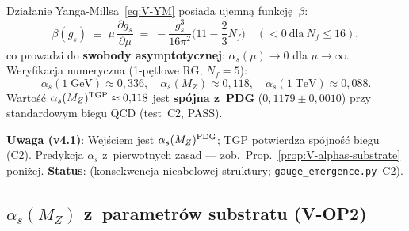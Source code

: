 \begin{corollary}\label{cor:V-AF}
Dzia\l{}anie Yanga-Millsa~\eqref{eq:V-YM} posiada ujemn\k{a}
funkcj\k{e}~$\beta$:
\begin{equation}\label{eq:V-beta}
  \beta(g_s) \;\equiv\; \mu\,\frac{\partial g_s}{\partial\mu}
  \;=\; -\frac{g_s^3}{16\pi^2}\bigl(11 - {\textstyle\frac{2}{3}}N_f\bigr)
  \quad (<0\ \text{dla}\ N_f \leq 16),
\end{equation}
co prowadzi do \textbf{swobody asymptotycznej}: $\alpha_s(\mu) \to 0$ dla
$\mu \to \infty$.
Weryfikacja numeryczna (1-p\k{e}tlowe RG, $N_f = 5$):
\begin{equation}\label{eq:V-alphas}
  \alpha_s(1\;\mathrm{GeV}) \approx 0{,}336,
  \quad
  \alpha_s(M_Z) \approx 0{,}118,
  \quad
  \alpha_s(1\;\mathrm{TeV}) \approx 0{,}088.
\end{equation}
Warto\'s\'c $\alpha_s(M_Z)^{\rm TGP} \approx 0{,}118$ jest
\textbf{sp\'ojna z~PDG} ($0{,}1179 \pm 0{,}0010$) przy standardowym
biegu QCD (test~C2, PASS).

\textbf{Uwaga (v4.1)}: Wej\'sciem jest $\alpha_s(M_Z)^{\rm PDG}$; TGP
potwierdza sp\'ojno\'s\'c biegu (C2).
Predykcja $\alpha_s$ z~pierwotnych zasad — zob.\ Prop.~\ref{prop:V-alphas-substrate} poni\.zej.
\textbf{Status}: 
(konsekwencja nieabelowej struktury; \texttt{gauge\_emergence.py}~C2).
\end{corollary}

\subsection{$\alpha_s(M_Z)$ z~parametr\'ow substratu (V-OP2)}%
\label{app:V-alphas}

